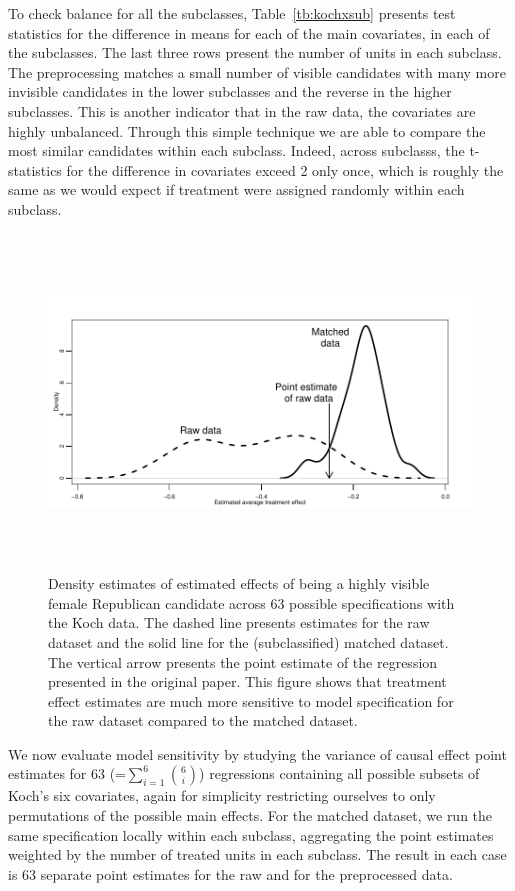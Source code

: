 \documentclass[11pt,titlepage]{article}
\begin{document}
To check balance for all the subclasses, Table~\ref{tb:kochxsub}
presents test statistics for the difference in means for each of the
main covariates, in each of the subclasses.  The last three rows
present the number of units in each subclass.  The preprocessing
matches a small number of visible candidates with many more invisible
candidates in the lower subclasses and the reverse in the higher
subclasses.  This is another indicator that in the raw data, the
covariates are highly unbalanced.  Through this simple technique we
are able to compare the most similar candidates within each subclass.
Indeed, across subclasss, the t-statistics for the difference in
covariates exceed 2 only once, which is roughly the same as we would
expect if treatment were assigned randomly within each subclass.
\begin{figure}[t] 
 \begin{center}
   \includegraphics[height=3.5in,angle=0]{figs/kochdens.pdf}
 \end{center} 
 \vspace{-0.275in}
 \caption{Density estimates of estimated effects of
   being a highly visible female Republican candidate across 63
   possible specifications with the Koch data.  The dashed line
   presents estimates for the raw dataset and the solid line for the
   (subclassified) matched dataset.  The vertical arrow presents the
   point estimate of the regression presented in the original paper.
   This figure shows that treatment effect estimates are much more
   sensitive to model specification for the raw dataset compared to
   the matched dataset.}
 \label{fg:kochdens}
\end{figure}

We now evaluate model sensitivity by studying the variance of causal
effect point estimates for 63 (=$\sum_{i=1}^6 {6 \choose i}$)
regressions containing all possible subsets of Koch's six covariates,
again for simplicity restricting ourselves to only permutations of the
possible main effects.  For the matched dataset, we run the same
specification locally within each subclass, aggregating the point
estimates weighted by the number of treated units in each subclass.
The result in each case is 63 separate point estimates for the raw and
for the preprocessed data.
\end{document}
